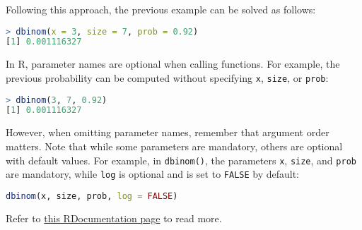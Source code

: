 Following this approach, the previous example can be solved as follows:
\begin{lstlisting}[language=R]
> dbinom(x = 3, size = 7, prob = 0.92)
[1] 0.001116327
\end{lstlisting}
In R, parameter names are optional when calling functions.
For example, the previous probability can be computed without specifying \verb|x|, \verb|size|, or \verb|prob|:
\begin{lstlisting}[language=R]
> dbinom(3, 7, 0.92)
[1] 0.001116327
\end{lstlisting}
However, when omitting parameter names, remember that argument order matters.
Note that while some parameters are mandatory, others are optional with default values.
For example, in \verb|dbinom()|, the parameters \verb|x|, \verb|size|, and \verb|prob| are mandatory,
while \verb|log| is optional and is set to \verb|FALSE| by default:
\begin{lstlisting}[language=R]
dbinom(x, size, prob, log = FALSE)
\end{lstlisting}
Refer to \href{https://www.rdocumentation.org/packages/stats/versions/3.3/topics/Binomial}{this RDocumentation page} to read more.

